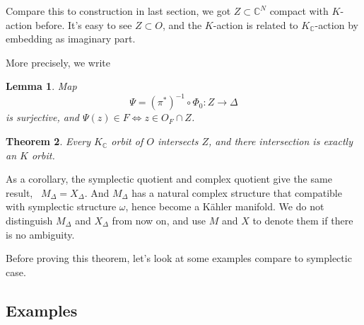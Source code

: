 \documentclass[12pt]{article}
\theoremstyle{plain}\newtheorem{theorem}{Theorem}
\theoremstyle{definition}\newtheorem{definition}[theorem]{Definition}
\theoremstyle{definition}\newtheorem{example}[theorem]{Example}
\theoremstyle{plain}\newtheorem{axiom}[theorem]{Axiom}
\theoremstyle{plain}\newtheorem{assertion}[theorem]{Assertion}
\theoremstyle{plain}\newtheorem{corollary}[theorem]{Corollary}
\theoremstyle{plain}\newtheorem{lemma}[theorem]{Lemma}
\theoremstyle{plain}\newtheorem{proposition}[theorem]{Proposition}
\theoremstyle{plain}\newtheorem{prop}[theorem]{Proposition}
\theoremstyle{plain}\newtheorem{conjecture}[theorem]{Conjecture}
\theoremstyle{plain}\newtheorem{conj}[theorem]{Conjecture}
\theoremstyle{plain}\newtheorem{problem}[theorem]{Problem}
\theoremstyle{remark}\newtheorem{notation}[theorem]{Notation}
\theoremstyle{definition}\newtheorem*{question}{Question}
\theoremstyle{definition}\newtheorem*{answer}{Answer}
\theoremstyle{definition}\newtheorem*{goal}{Goal}
\theoremstyle{plain}\newtheorem*{application}{Application}
\theoremstyle{plain}\newtheorem*{exercise}{Exercise}
\theoremstyle{remark}\newtheorem*{remark}{Remark}
\theoremstyle{remark}\newtheorem*{note}{\small{Note}}
\numberwithin{equation}{section}
\numberwithin{theorem}{section}
\numberwithin{figure}{section}
\begin{document}
Compare this to construction in last section, we got \(Z\subset \mathbb{C}^N\) compact
with \(K\)-action before. It's easy to see \(Z\subset O\), and the \(K\)-action
is related to \(K_{\mathbb{C}}\)-action by embedding as imaginary part.

More precisely, we write
\begin{lemma}
    Map \[
        \Psi=(\pi^*)^{-1}\circ \Phi_0\colon Z\to \Delta
    \] is surjective, and \(\Psi(z)\in F \iff z\in O_F\cap Z\).
\end{lemma}

\begin{theorem}\label{thm:orbit-intersect}
    Every \(K_{\mathbb{C}}\) orbit of \(O\) intersects \(Z\), and there intersection
    is exactly an \(K\) orbit.
\end{theorem}
As a corollary, the symplectic quotient and complex quotient give the same result,
\ie\ \(M_\Delta=X_\Delta\). And \(M_\Delta\) has a natural complex structure that
compatible with symplectic structure \(\omega\), hence become a K\"ahler manifold.
We do not distinguish \(M_\Delta\) and \(X_\Delta\) from now on, and use \(M\) and
\(X\) to denote them if there is no ambiguity.

Before proving this theorem, let's look at some examples compare to symplectic case.
\subsection{Examples}
\end{document}
